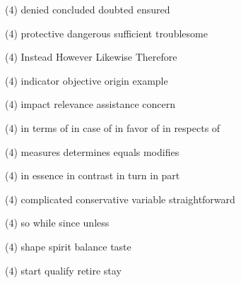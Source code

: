\item
\begin{tasks}(4)
	\task denied
	\task concluded
	\task doubted
	\task ensured
\end{tasks}
\item
\begin{tasks}(4)
	\task protective
	\task dangerous
	\task sufficient
	\task troublesome
\end{tasks}
\item
\begin{tasks}(4)
	\task Instead
	\task However
	\task Likewise
	\task Therefore
\end{tasks}
\item
\begin{tasks}(4)
	\task indicator
	\task objective
	\task origin
	\task example
\end{tasks}
\item
\begin{tasks}(4)
	\task impact
	\task relevance
	\task assistance
	\task concern
\end{tasks}
\item
\begin{tasks}(4)
	\task in terms of
	\task in case of
	\task in favor of
	\task in respects of
\end{tasks}
\item
\begin{tasks}(4)
	\task measures
	\task determines
	\task equals
	\task modifies
\end{tasks}
\item
\begin{tasks}(4)
	\task in essence
	\task in contrast
	\task in turn
	\task in part
\end{tasks}
\item
\begin{tasks}(4)
	\task complicated
	\task conservative
	\task variable
	\task straightforward
\end{tasks}
\item
\begin{tasks}(4)
	\task so
	\task while
	\task since
	\task unless
\end{tasks}
\item
\begin{tasks}(4)
	\task shape
	\task spirit
	\task balance
	\task taste
\end{tasks}
\item
\begin{tasks}(4)
	\task start
	\task qualify
	\task retire
	\task stay
\end{tasks}

